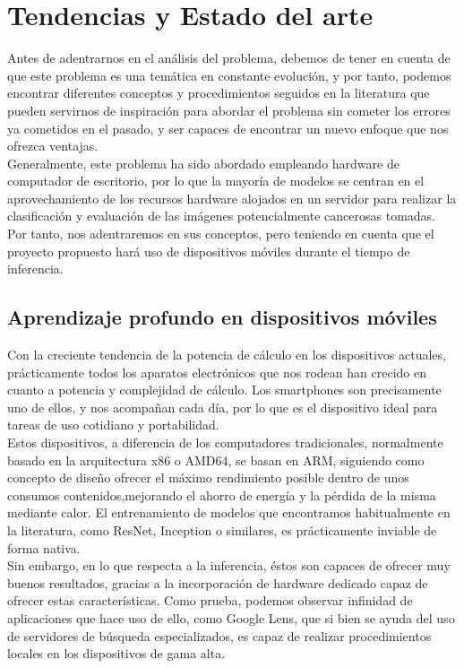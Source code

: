 \chapter{Tendencias y Estado del arte}

Antes de adentrarnos en el análisis del problema, debemos de tener en cuenta de que este problema es una temática en constante evolución, y por tanto, podemos encontrar diferentes conceptos y procedimientos seguidos en la literatura que pueden servirnos de inspiración para abordar el problema sin cometer los errores ya cometidos en el pasado, y ser capaces de encontrar un nuevo enfoque que nos ofrezca ventajas.\\

Generalmente, este problema ha sido abordado empleando hardware de computador de escritorio, por lo que la mayoría de modelos se centran en el aprovechamiento de los recursos hardware alojados en un servidor para realizar la clasificación y evaluación de las imágenes potencialmente cancerosas tomadas. Por tanto, nos adentraremos en sus conceptos, pero teniendo en cuenta que el proyecto propuesto hará uso de dispositivos móviles durante el tiempo de inferencia.

\section{Aprendizaje profundo en dispositivos móviles}

Con la creciente tendencia de la potencia de cálculo en los dispositivos actuales, prácticamente todos los aparatos electrónicos que nos rodean han crecido en cuanto a potencia y complejidad de cálculo. Los smartphones son precisamente uno de ellos, y nos acompañan cada día, por lo que es el dispositivo ideal para tareas de uso cotidiano y portabilidad.\\

Estos dispositivos, a diferencia de los computadores tradicionales, normalmente basado en la arquitectura x86 o AMD64, se basan en ARM, siguiendo como concepto de diseño ofrecer el máximo rendimiento posible dentro de unos consumos contenidos,mejorando el ahorro de energía y la pérdida de la misma mediante calor. El entrenamiento de modelos que encontramos habitualmente en la literatura, como ResNet, Inception o similares, es prácticamente inviable de forma nativa.\\

Sin embargo, en lo que respecta a la inferencia, éstos son capaces de ofrecer muy buenos resultados, gracias a la incorporación de hardware dedicado capaz de ofrecer estas características. Como prueba, podemos observar infinidad de aplicaciones que hace uso de ello, como Google Lens, que si bien se ayuda del uso de servidores de búsqueda especializados, es capaz de realizar procedimientos locales en los dispositivos de gama alta. \\

